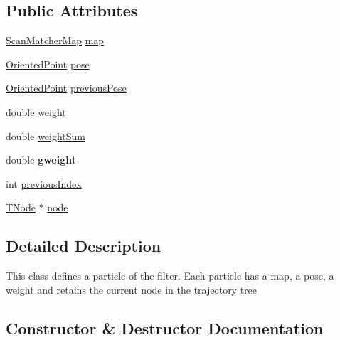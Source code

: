 \subsection*{Public Attributes}
\begin{DoxyCompactItemize}
\item 
\hyperlink{classGMapping_1_1Map}{Scan\+Matcher\+Map} \hyperlink{structGMapping_1_1GridSlamProcessor_1_1Particle_a33f1690ccf3a95622e0246e75f5af145}{map}
\item 
\hyperlink{structGMapping_1_1orientedpoint}{Oriented\+Point} \hyperlink{structGMapping_1_1GridSlamProcessor_1_1Particle_a82d332a479fe5441be6f6f7be32ba39d}{pose}
\item 
\hyperlink{structGMapping_1_1orientedpoint}{Oriented\+Point} \hyperlink{structGMapping_1_1GridSlamProcessor_1_1Particle_aa0bfef7c1113864bc0dd5c3e38cfbf38}{previous\+Pose}
\item 
double \hyperlink{structGMapping_1_1GridSlamProcessor_1_1Particle_a29fee66d34dd87e2bd641eeebfe6fc00}{weight}
\item 
double \hyperlink{structGMapping_1_1GridSlamProcessor_1_1Particle_a9e1d6ebe3b70943834d2987e826313ef}{weight\+Sum}
\item 
\mbox{\label{structGMapping_1_1GridSlamProcessor_1_1Particle_a205c1435fc24f59460c76362b65da10c}} 
double {\bfseries gweight}
\item 
int \hyperlink{structGMapping_1_1GridSlamProcessor_1_1Particle_ab80f34a85a79ad4584d25b162bb72e5b}{previous\+Index}
\item 
\hyperlink{structGMapping_1_1GridSlamProcessor_1_1TNode}{T\+Node} $\ast$ \hyperlink{structGMapping_1_1GridSlamProcessor_1_1Particle_a9c91ccdf7009b50785d939e1791ae4be}{node}
\end{DoxyCompactItemize}


\subsection{Detailed Description}
This class defines a particle of the filter. Each particle has a map, a pose, a weight and retains the current node in the trajectory tree 

\subsection{Constructor \& Destructor Documentation}
\mbox{\label{structGMapping_1_1GridSlamProcessor_1_1Particle_a51dc73563ad5e3035f8cb3b51965854a}} 
